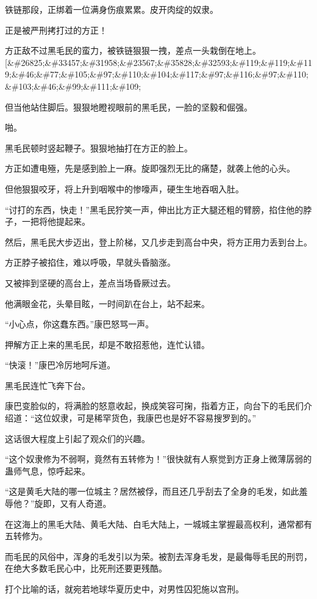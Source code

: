 \begin{this_body}
铁链那段，正绑着一位满身伤痕累累。皮开肉绽的奴隶。

正是被严刑拷打过的方正！

方正敌不过黑毛民的蛮力，被铁链狠狠一拽，差点一头栽倒在地上。[\&\#26825;\&\#33457;\&\#31958;\&\#23567;\&\#35828;\&\#32593;\&\#119;\&\#119;\&\#119;\&\#46;\&\#77;\&\#105;\&\#97;\&\#110;\&\#104;\&\#117;\&\#97;\&\#116;\&\#97;\&\#110;\&\#103;\&\#46;\&\#99;\&\#111;\&\#109;

但当他站住脚后。狠狠地瞪视眼前的黑毛民，一脸的坚毅和倔强。

啪。

黑毛民顿时竖起鞭子。狠狠地抽打在方正的脸上。

方正如遭电殛，先是感到脸上一麻。旋即强烈无比的痛楚，就袭上他的心头。

但他狠狠咬牙，将上升到咽喉中的惨嚎声，硬生生地吞咽入肚。

“讨打的东西，快走！”黑毛民狞笑一声，伸出比方正大腿还粗的臂膀，掐住他的脖子，一把将他提起来。

然后，黑毛民大步迈出，登上阶梯，又几步走到高台中央，将方正用力丢到台上。

方正脖子被掐住，难以呼吸，早就头昏脑涨。

又被摔到坚硬的高台上，差点当场昏厥过去。

他满眼金花，头晕目眩，一时间趴在台上，站不起来。

“小心点，你这蠢东西。”康巴怒骂一声。

押解方正上来的黑毛民，却是不敢招惹他，连忙认错。

“快滚！”康巴冷厉地呵斥道。

黑毛民连忙飞奔下台。

康巴变脸似的，将满脸的怒意收起，换成笑容可掬，指着方正，向台下的毛民们介绍道：“这位奴隶，可是稀罕货色，我康巴也是好不容易搜罗到的。”

这话很大程度上引起了观众们的兴趣。

“这个奴隶修为不弱啊，竟然有五转修为！”很快就有人察觉到方正身上微薄孱弱的蛊师气息，惊呼起来。

“这是黄毛大陆的哪一位城主？居然被俘，而且还几乎刮去了全身的毛发，如此羞辱他？”旋即，又有人奇道。

在这海上的黑毛大陆、黄毛大陆、白毛大陆上，一城城主掌握最高权利，通常都有五转修为。

而毛民的风俗中，浑身的毛发引以为荣。被割去浑身毛发，是最侮辱毛民的刑罚，在绝大多数毛民心中，比死刑还要更残酷。

打个比喻的话，就宛若地球华夏历史中，对男性囚犯施以宫刑。


\end{this_body}
